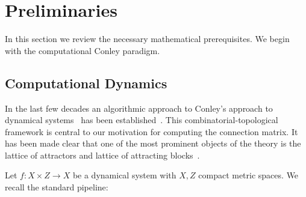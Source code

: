 

\section{Preliminaries}\label{sec:prelims}


In this section we review the necessary mathematical prerequisites.  We begin with the computational Conley paradigm.


\subsection{Computational Dynamics}

In the last few decades an algorithmic approach to Conley's approach to dynamical systems~\cite{conley} has been established~\cite{kmv, cmdb, cmdbchaos}.  This combinatorial-topological framework is central to our motivation for computing the connection matrix.  It has been made clear that one of the most prominent objects of the theory is the lattice of attractors and lattice of attracting blocks~\cite{kmv,lsa,lsa2,salamon}.

Let $f:X\times Z\to X$ be a dynamical system with $X,Z$ compact metric spaces.  We recall the standard pipeline:

